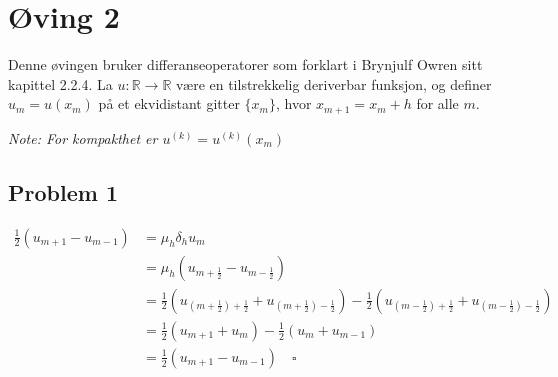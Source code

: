 \section*{Øving 2}

Denne øvingen bruker differanseoperatorer som forklart i Brynjulf Owren sitt kapittel 2.2.4. La \( u : \mathbb{R} \to \mathbb{R} \) være en tilstrekkelig deriverbar funksjon, og definer \( u_m = u(x_m) \) på et ekvidistant gitter \( \{x_m\} \), hvor \( x_{m+1} = x_m + h \) for alle \( m \).

\small\textit{Note: For kompakthet er \(u^{(k)} = u^{(k)}(x_m)\)}



\subsection*{Problem 1}


\begin{align*}
    \frac{1}{2} \left( u_{m+1} - u_{m-1} \right) & = \mu_h \delta_h u_m                                                                                                                                                                  \\
                                                 & = \mu_h \left( u_{m+\frac{1}{2}} - u_{m-\frac{1}{2}} \right)                                                                                                                          \\
                                                 & = \frac{1}{2} ( u_{(m + \frac{1}{2}) + \frac{1}{2}} + u_{(m + \frac{1}{2}) - \frac{1}{2}}) - \frac{1}{2} ( u_{(m - \frac{1}{2}) + \frac{1}{2}} + u_{(m - \frac{1}{2}) - \frac{1}{2}}) \\
                                                 & = \frac{1}{2} ( u_{m+1} + u_m)- \frac{1}{2} ( u_m + u_{m-1})                                                                                                                          \\
                                                 & = \frac{1}{2} ( u_{m+1} - u_{m-1}) \quad \square
\end{align*}


